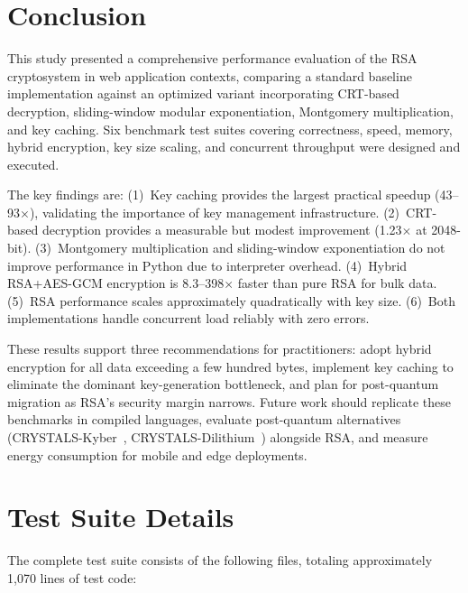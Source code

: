 \documentclass[journal]{IEEEtran}
\begin{document}
\section{Conclusion}
\label{sec:conclusion}

This study presented a comprehensive performance evaluation of the RSA cryptosystem in web application contexts, comparing a standard baseline implementation against an optimized variant incorporating CRT-based decryption, sliding-window modular exponentiation, Montgomery multiplication, and key caching. Six benchmark test suites covering correctness, speed, memory, hybrid encryption, key size scaling, and concurrent throughput were designed and executed.

The key findings are: (1)~Key caching provides the largest practical speedup (43--93$\times$), validating the importance of key management infrastructure. (2)~CRT-based decryption provides a measurable but modest improvement (1.23$\times$ at 2048-bit). (3)~Montgomery multiplication and sliding-window exponentiation do not improve performance in Python due to interpreter overhead. (4)~Hybrid RSA+AES-GCM encryption is 8.3--398$\times$ faster than pure RSA for bulk data. (5)~RSA performance scales approximately quadratically with key size. (6)~Both implementations handle concurrent load reliably with zero errors.

These results support three recommendations for practitioners: adopt hybrid encryption for all data exceeding a few hundred bytes, implement key caching to eliminate the dominant key-generation bottleneck, and plan for post-quantum migration as RSA's security margin narrows. Future work should replicate these benchmarks in compiled languages, evaluate post-quantum alternatives (CRYSTALS-Kyber~\cite{kyber2023}, CRYSTALS-Dilithium~\cite{dilithium2022}) alongside RSA, and measure energy consumption for mobile and edge deployments.


\appendices

\section{Test Suite Details}
\label{app:tests}

The complete test suite consists of the following files, totaling approximately 1,070 lines of test code:
\end{document}

